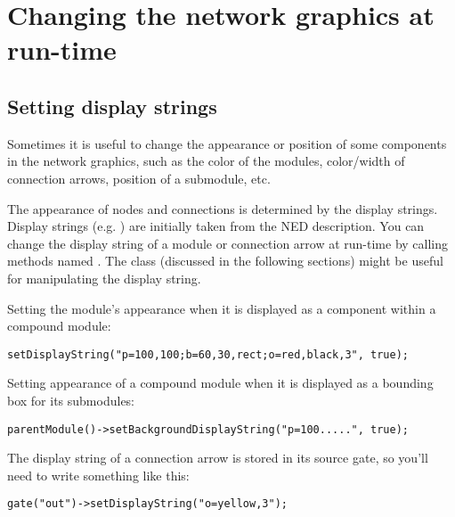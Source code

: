 \section{Changing the network graphics at run-time}



\subsection{Setting display strings}

Sometimes it is useful to change the appearance or position of
some components in the network graphics, such as the color of the
modules, color/width of connection arrows,
position of a submodule, etc.

The appearance of nodes and connections is determined by the display
strings. Display strings (e.g. )
are initially taken from the NED description.
You can change the display string of a module or connection arrow
at run-time by calling methods named .
The  class (discussed in the following sections)
might be useful for manipulating the display string.

Setting the module's appearance when it is displayed as a component
within a compound module:

\begin{verbatim}
setDisplayString("p=100,100;b=60,30,rect;o=red,black,3", true);
\end{verbatim}

Setting appearance of a compound module when it is displayed as a
bounding box for its submodules:

\begin{verbatim}
parentModule()->setBackgroundDisplayString("p=100.....", true);
\end{verbatim}

The display string of a connection arrow
is stored in its source gate, so you'll need to write something
like this:

\begin{verbatim}
gate("out")->setDisplayString("o=yellow,3");
\end{verbatim}

